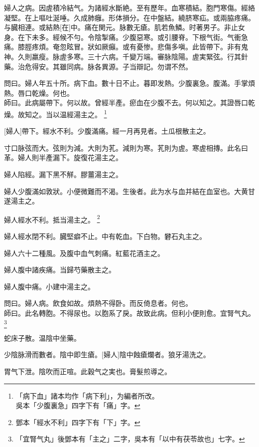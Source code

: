 \documentclass[12pt,twoside,UTF8,b5paper]{ctexbook}
\begin{document}
婦人之病。因虗積冷結气。为諸經水斷絶。至有歷年。血寒積結。胞門寒傷。經絡凝堅。在上嘔吐涎唾。久成肺癰。形体損分。在中盤結。繞脐寒疝。或兩脇疼痛。与臓相連。或結熱[在]中。痛在関元。脉數无瘡。肌若魚鱗。时著男子。非止女身。在下未多。經候不勻。令陰掣痛。少腹惡寒。或引腰脊。下根气街。气衝急痛。膝脛疼煩。奄忽眩冒。狀如厥癲。或有憂惨。悲傷多嗔。此皆帶下。非有鬼神。久則羸瘦。脉虗多寒。三十六病。千變万端。審脉陰陽。虗実緊弦。行其針藥。治危得安。其雖同病。脉各異源。子当辯記。勿谓不然。

問曰。婦人年五十所。病下血。數十日不止。暮即发熱。少腹裏急。腹滿。手掌煩熱。唇口乾燥。何也。\\
師曰。此病屬帶下。何以故。曾經半產。瘀血在少腹不去。何以知之。其證唇口乾燥。故知之。当以温經湯主之。
	\footnote{「病下血」諸本均作「病下利」，为編者所改。\\吳本「少腹裏急」四字下有「痛」字。}

[婦人]帶下。經水不利。少腹滿痛。經一月再見者。土瓜根散主之。

寸口脉弦而大。弦則为減。大則为芤。減則为寒。芤則为虗。寒虗相摶。此名曰革。婦人則半產漏下。旋復花湯主之。

婦人陷經。漏下黑不觧。膠薑湯主之。

婦人少腹滿如敦狀。小便微難而不渴。生後者。此为水与血并結在血室也。大黄甘遂湯主之。

婦人經水不利。抵当湯主之。
	\footnote{鄧本「經水不利」四字下有「下」字。}

婦人經水閉不利。臓堅癖不止。中有乾血。下白物。礬石丸主之。

婦人六十二種風。及腹中血气刺痛。紅藍花酒主之。

婦人腹中諸疾痛。当歸芍藥散主之。

婦人腹中痛。小建中湯主之。

問曰。婦人病。飲食如故。煩熱不得卧。而反倚息者。何也。\\
師曰。此名轉胞。不得尿也。以胞系了戾。故致此病。但利小便則愈。宜腎气丸。
	\footnote{「宜腎气丸」後鄧本有「主之」二字，吳本有「以中有茯苓故也」七字。}

蛇床子散。温陰中坐藥。

少陰脉滑而數者。陰中即生瘡。[婦人]陰中蝕瘡爛者。狼牙湯洗之。

胃气下泄。陰吹而正喧。此穀气之実也。膏髮煎導之。
\end{document}

